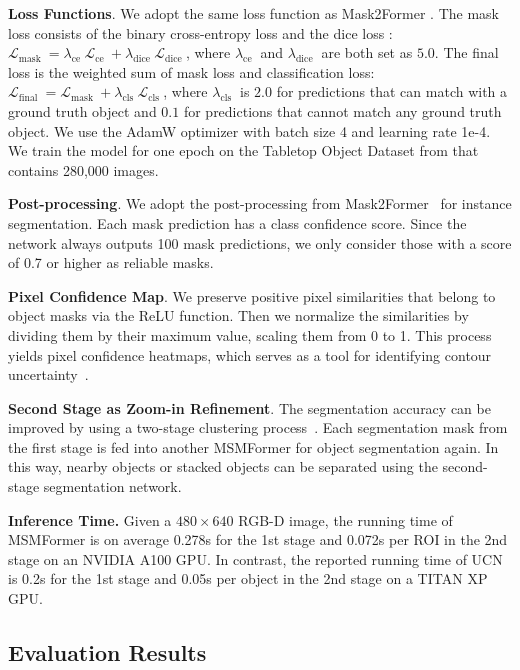 \documentclass[letterpaper, 10 pt, conference]{ieeeconf}
\begin{document}
\textbf{Loss Functions}. We adopt the same loss function as Mask2Former \cite{cheng2022masked}. The mask loss consists of the binary cross-entropy loss and the dice loss \cite{milletari2016v}: $\mathcal{L}_{\text {mask }}=\lambda_{\text {ce }} \mathcal{L}_{\text {ce }}+\lambda_{\text {dice }} \mathcal{L}_{\text {dice }}$, where $\lambda_{\text {ce }}$  and $\lambda_{\text {dice }}$ are both set as $5.0$. The final loss is the weighted sum of mask loss and classification loss: $\mathcal{L}_{\text {final }}=\mathcal{L}_{\text {mask }}+\lambda_{\text {cls }} \mathcal{L}_{\text {cls }}$, where $\lambda_{\text {cls }}$ is $2.0$ for predictions that can match with a ground truth object and $0.1$ for predictions that cannot match any ground truth object. We use the AdamW optimizer \cite{loshchilov2017decoupled} with batch size 4 and learning rate 1e-4. We train the model for one epoch on the Tabletop Object Dataset from \cite{xie2020best} that contains 280,000 images. 

\textbf{Post-processing}. We adopt the post-processing from Mask2Former~\cite{cheng2022masked} for instance segmentation. Each mask prediction has a class confidence score. Since the network always outputs 100 mask predictions, we only consider those with a score of 0.7 or higher as reliable masks. 

\textbf{Pixel Confidence Map}. We preserve positive pixel similarities that belong to object masks via the ReLU function. Then we normalize the similarities by dividing them by their maximum value, scaling them from 0 to 1. This process yields pixel confidence heatmaps, which serves as a tool for identifying contour uncertainty~\cite{xie2022rice}.

\textbf{Second Stage as Zoom-in Refinement}. The segmentation accuracy can be improved by using a two-stage clustering process~\cite{xiang2020learning}. Each segmentation mask from the first stage is fed into another MSMFormer for object segmentation again. In this way, nearby objects or stacked objects can be separated using the second-stage segmentation network.

\textbf{Inference Time.} Given a $480 \times 640$ RGB-D image, the running time of MSMFormer is on average 0.278s for the 1st stage and 0.072s per ROI in the 2nd stage on an NVIDIA A100 GPU. In contrast, the reported running time of UCN~\cite{xiang2020learning} is 0.2s for the 1st stage and 0.05s per object in the 2nd stage on a TITAN XP GPU. 

\subsection{Evaluation Results}
\end{document}
